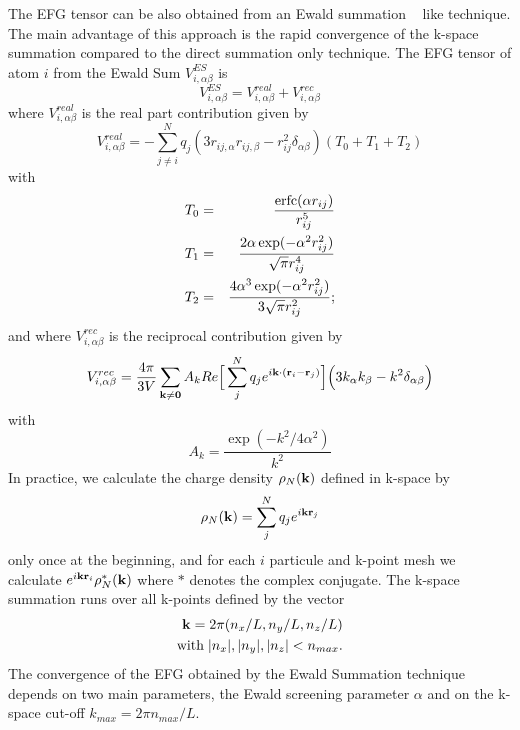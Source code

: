 \documentclass[a4paper,8pt]{article}
\def\kk{{\bf k}}
\def\rr{{\bf r}}
\def\00{{\bf 0}}
\begin{document}
The EFG tensor can be also obtained from an Ewald summation
~\cite{ANDP:ANDP19213690304,B-ALLEN_TILDESLEY} like technique.
The main advantage of this approach is the rapid convergence of
the k-space summation compared to the direct summation only technique.
The EFG tensor of atom $i$ from the Ewald Sum $V^{ES}_{i,\alpha\beta}$ is
\begin{equation}
V^{ES}_{i,\alpha\beta} = V^{real}_{i,\alpha\beta} + V^{rec}_{i,\alpha\beta}
\label{eq:EFG_ES}
\end{equation}
where $V^{real}_{i,\alpha\beta}$ is the real part contribution given by
\begin{equation}
V^{real}_{i,\alpha\beta} = - \sum^{N}_{j\ne i} q_j (3 r_{ij,\alpha}r_{ij,\beta} - r_{ij}^2\delta_{\alpha\beta} ) ( T_0 + T_1 + T_2 ) 
\end{equation}
with
\begin{eqnarray}
T_0&=& \frac{{\rm erfc}( \alpha r_{ij} )} {r_{ij}^5} \nonumber \\
T_1&=& \frac{2 \alpha \exp(-\alpha^2 r_{ij}^2)}{\sqrt{\pi}r_{ij}^4}  \nonumber \\
T_2&=& \frac{4 \alpha^3 \exp(-\alpha^2 r_{ij}^2)}{3\sqrt{\pi} r_{ij}^2};
\end{eqnarray}
and where $V^{rec}_{i,\alpha\beta}$ is the reciprocal contribution given by
\begin{equation}
V^{rec}_{i,\alpha\beta} = \frac{4\pi}{3V}\sum_{\kk\ne\00} A_k Re\Big[ \sum^N_j q_j e^{i\kk\cdot(\rr_i-\rr_j)} \Big] \Big( 3 k_\alpha k_\beta - k^2\delta_{\alpha\beta} \Big)
\end{equation}
with
\begin{equation}
A_k = \frac{\exp( - k^2 / 4\alpha^2 )}{k^2} 
\end{equation}
In practice, we calculate the charge density $\rho_N(\kk)$ defined in k-space by
\begin{equation}
\rho_N(\kk) = \sum^N_j q_j e^{i\kk\rr_j}
\end{equation}
only once at the beginning, and for each $i$ particule and k-point mesh
we calculate $e^{i\kk\rr_i} \rho^*_N(\kk)$ where $*$ denotes the complex conjugate.
The k-space summation runs over all k-points defined by the vector
\begin{eqnarray}
\kk=2\pi(n_x/L,n_y/L,n_z/L) \\
{\rm with}\; |n_x|,|n_y|,|n_z| < n_{max}.
\end{eqnarray}
The convergence of the EFG obtained by the Ewald Summation technique
depends on two main parameters, the Ewald screening parameter $\alpha$
and on the k-space cut-off $k_{max}=2\pi n_{max}/L$.
\end{document}
